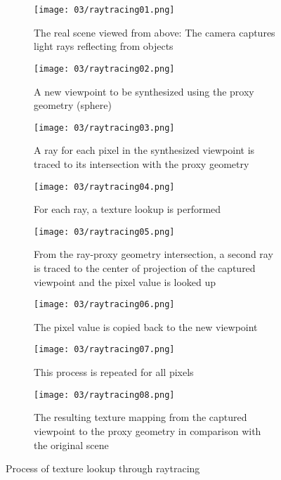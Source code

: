 \begin{figure}
\centering
    \hfill
    \begin{subfigure}[t]{0.3\textwidth}            
            \centering
            \texttt{[image: 03/raytracing01.png]}
            \caption{The real scene viewed from above: The camera captures light rays reflecting from objects}
    \end{subfigure}%
    \hfill
    \begin{subfigure}[t]{0.3\textwidth}
            \centering
            \texttt{[image: 03/raytracing02.png]}
            \caption{A new viewpoint to be synthesized using the proxy geometry (sphere)}
    \end{subfigure}
    \hfill
    \hfill

    \hfill
    \begin{subfigure}[t]{0.3\textwidth}            
            \centering
            \texttt{[image: 03/raytracing03.png]}
            \caption{A ray for each pixel in the synthesized viewpoint is traced to its intersection with the proxy geometry}
    \end{subfigure}%
    \hfill
    \begin{subfigure}[t]{0.3\textwidth}
            \centering
            \texttt{[image: 03/raytracing04.png]}
            \caption{For each ray, a texture lookup is performed}
    \end{subfigure}
    \hfill
    \begin{subfigure}[t]{0.3\textwidth}
            \centering
            \texttt{[image: 03/raytracing05.png]}
            \caption{From the ray-proxy geometry intersection, a second ray is traced to the center of projection of the captured viewpoint and the pixel value is looked up}
    \end{subfigure}
    \hfill

    \hfill
    \begin{subfigure}[t]{0.3\textwidth}            
            \centering
            \texttt{[image: 03/raytracing06.png]}
            \caption{The pixel value is copied back to the new viewpoint}
    \end{subfigure}%
    \hfill
    \begin{subfigure}[t]{0.3\textwidth}
            \centering
            \texttt{[image: 03/raytracing07.png]}
            \caption{This process is repeated for all pixels}
    \end{subfigure}
    \hfill
    \begin{subfigure}[t]{0.3\textwidth}
            \centering
            \texttt{[image: 03/raytracing08.png]}
            \caption{The resulting texture mapping from the captured viewpoint to the proxy geometry in comparison with the original scene}
    \end{subfigure}
    \hfill
    \caption[Texture lookup through raytracing]{Process of texture lookup through raytracing}\label{fig:raytracing}
\end{figure}

